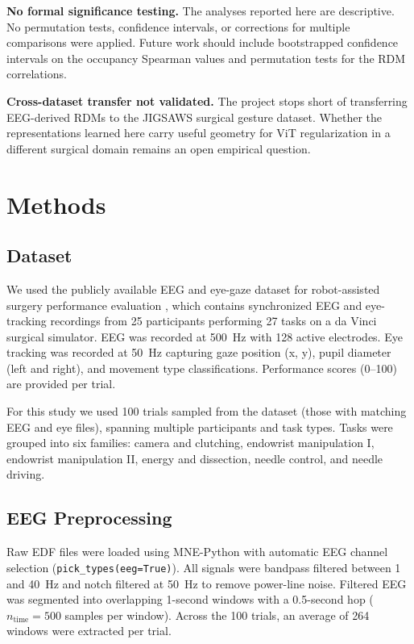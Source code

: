 \documentclass[11pt, letterpaper]{article}
\begin{document}
\textbf{No formal significance testing.} The analyses reported here are descriptive.
No permutation tests, confidence intervals, or corrections for multiple comparisons
were applied. Future work should include bootstrapped confidence intervals on the
occupancy Spearman values and permutation tests for the RDM correlations.

\textbf{Cross-dataset transfer not validated.} The project stops short of transferring
EEG-derived RDMs to the JIGSAWS surgical gesture dataset. Whether the representations
learned here carry useful geometry for ViT regularization in a different surgical domain
remains an open empirical question.

\section{Methods}

\subsection{Dataset}

We used the publicly available EEG and eye-gaze dataset for robot-assisted surgery
performance evaluation \citep{shafiei2023eeg}, which contains synchronized EEG and
eye-tracking recordings from 25 participants performing 27 tasks on a da Vinci surgical
simulator. EEG was recorded at 500~Hz with 128 active electrodes. Eye tracking was
recorded at 50~Hz capturing gaze position (x, y), pupil diameter (left and right), and
movement type classifications. Performance scores (0--100) are provided per trial.

For this study we used 100 trials sampled from the dataset (those with matching EEG and
eye files), spanning multiple participants and task types. Tasks were grouped into six
families: camera and clutching, endowrist manipulation I, endowrist manipulation II,
energy and dissection, needle control, and needle driving.

\subsection{EEG Preprocessing}

Raw EDF files were loaded using MNE-Python \citep{gramfort2013meg} with automatic EEG
channel selection (\texttt{pick\_types(eeg=True)}). All signals were bandpass filtered
between 1 and 40~Hz and notch filtered at 50~Hz to remove power-line noise. Filtered
EEG was segmented into overlapping 1-second windows with a 0.5-second hop
($n_{\text{time}} = 500$ samples per window). Across the 100 trials, an average of
264 windows were extracted per trial.
\end{document}

